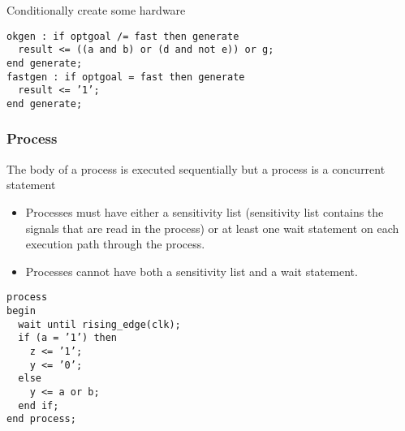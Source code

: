 \documentclass[
]{article}
\providecommand{\tightlist}{%
  \setlength{\itemsep}{0pt}\setlength{\parskip}{0pt}}
\begin{document}
Conditionally create some hardware

\begin{verbatim}
okgen : if optgoal /= fast then generate 
  result <= ((a and b) or (d and not e)) or g;
end generate;
fastgen : if optgoal = fast then generate
  result <= ’1’;
end generate;
\end{verbatim}

\hypertarget{process}{%
\subsubsection{Process}\label{process}}

The body of a process is executed sequentially but a process is a concurrent statement

\begin{itemize}
\tightlist
\item
  Processes must have either a sensitivity list (sensitivity list contains the signals that are read in the process) or at least one wait statement on each execution path through the process.
\item
  Processes cannot have both a sensitivity list and a wait statement.
\end{itemize}

\begin{verbatim}
process
begin
  wait until rising_edge(clk); 
  if (a = ’1’) then
    z <= ’1’;
    y <= ’0’; 
  else
    y <= a or b; 
  end if;
end process;
\end{verbatim}
\end{document}
